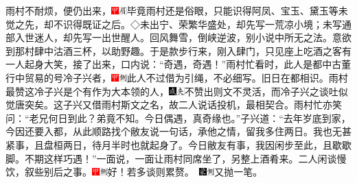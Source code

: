 {雨村不耐烦，便仍出来，{\includegraphics[width=3mm]{../Images/00002}\includegraphics[width=3mm]{../Images/00010}\footnotesize \kaishu 毕竟雨村还是俗眼，只能识得阿凤、宝玉、黛玉等未觉之先，却不识得既证之后。◇未出宁、荣繁华盛处，却先写一荒凉小境；未写通部入世迷人，却先写一出世醒人。回风舞雪，倒峡逆波，别小说中所无之法。}意欲到那村肆中沽酒三杯，以助野趣。于是款步行来，刚入肆门，只见座上吃酒之客有一人起身大笑，接了出来，口内说：``奇遇，奇遇！''雨村忙看时，此人是都中古董行中贸易的号冷子兴者，{\includegraphics[width=3mm]{../Images/00002}\includegraphics[width=3mm]{../Images/00011}\footnotesize \kaishu 此人不过借为引绳，不必细写。}旧日在都相识。雨村最赞这冷子兴是个有作为大本领的人，{\includegraphics[width=3mm]{../Images/00005}\includegraphics[width=3mm]{../Images/00012}\footnotesize \kaishu 不赞出则文不灵活，而冷子兴之谈吐似觉唐突矣。}这子兴又借雨村斯文之名，故二人说话投机，最相契合。雨村忙亦笑问：``老兄何日到此？弟竟不知。今日偶遇，真奇缘也。''子兴道：``去年岁底到家，今因还要入都，从此顺路找个敝友说一句话，承他之情，留我多住两日。我也无甚紧事，且盘桓两日，待月半时也就起身了。今日敝友有事，我因闲步至此，且歇歇脚。不期这样巧遇！''一面说，一面让雨村同席坐了，另整上酒肴来。二人闲谈慢饮，叙些别后之事。{{\includegraphics[width=3mm]{../Images/00002}\includegraphics[width=3mm]{../Images/00011}\footnotesize \kaishu 好！若多谈则累赘。　}\includegraphics[width=3mm]{../Images/00006}\includegraphics[width=3mm]{../Images/00011}\footnotesize \kaishu 又抛一笔。}

}
